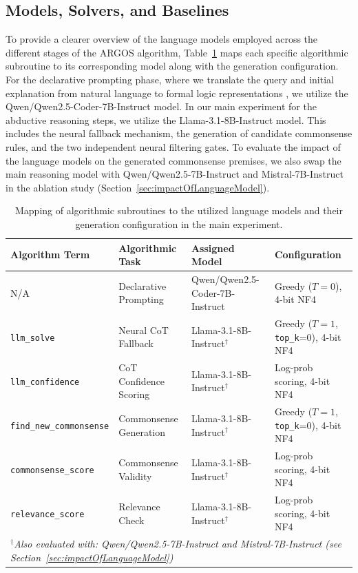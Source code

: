 \subsection{Models, Solvers, and Baselines}
\label{sec:modelsAndBaselines}
To provide a clearer overview of the language models employed across the different stages of the ARGOS algorithm, Table~\ref{tab:models_usage} maps each specific algorithmic subroutine to its corresponding model along with the generation configuration. For the declarative prompting phase, where we translate the query and initial explanation from natural language to formal logic representations \citep{ye2023satlm}, we utilize the Qwen/Qwen2.5-Coder-7B-Instruct model. In our main experiment for the abductive reasoning steps, we utilize the Llama-3.1-8B-Instruct model. This includes the neural fallback mechanism, the generation of candidate commonsense rules, and the two independent neural filtering gates. To evaluate the impact of the language models on the generated commonsense premises, we also swap the main reasoning model with Qwen/Qwen2.5-7B-Instruct and Mistral-7B-Instruct in the ablation study (Section~\ref{sec:impactOfLanguageModel}).

\begin{table}[H]
    \centering
    \caption{Mapping of algorithmic subroutines to the utilized language models and their generation configuration in the main experiment.}
    \label{tab:models_usage}
    \begin{tabular}{lp{3cm}p{4.5cm}p{3cm}}
        \toprule
        \textbf{Algorithm Term} & \textbf{Algorithmic Task} & \textbf{Assigned Model} & \textbf{Configuration} \\
        \midrule
        N/A & Declarative Prompting & Qwen/Qwen2.5-Coder-7B-Instruct & Greedy ($T=0$), 4-bit NF4 \\
        \texttt{llm\_solve} & Neural CoT Fallback & Llama-3.1-8B-Instruct$^\dagger$ & Greedy ($T=1$, \texttt{top\_k}=0), 4-bit NF4 \\
        \texttt{llm\_confidence} & CoT Confidence Scoring & Llama-3.1-8B-Instruct$^\dagger$ & Log-prob scoring, 4-bit NF4 \\
        \texttt{find\_new\_commonsense} & Commonsense Generation & Llama-3.1-8B-Instruct$^\dagger$ & Greedy ($T=1$, \texttt{top\_k}=0), 4-bit NF4 \\
        \texttt{commonsense\_score} & Commonsense Validity & Llama-3.1-8B-Instruct$^\dagger$ & Log-prob scoring, 4-bit NF4 \\
        \texttt{relevance\_score} & Relevance Check & Llama-3.1-8B-Instruct$^\dagger$ & Log-prob scoring, 4-bit NF4 \\
        \midrule
        \multicolumn{4}{l}{$^\dagger$\textit{Also evaluated with: Qwen/Qwen2.5-7B-Instruct and Mistral-7B-Instruct (see Section~\ref{sec:impactOfLanguageModel})}} \\
        \bottomrule
    \end{tabular}
\end{table}

